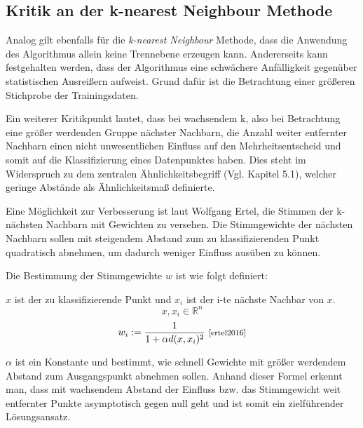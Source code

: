 \documentclass[fontsize=11pt]{scrartcl}
\begin{document}
            \subsection{Kritik an der k-nearest Neighbour Methode}
            \label{subsec:kritikknn}
                Analog gilt ebenfalls für die \emph{k-nearest Neighbour} Methode, dass die Anwendung des Algorithmus allein keine Trennebene erzeugen kann.
                Andererseits kann festgehalten werden, dass der Algorithmus eine schwächere Anfälligkeit gegenüber statistischen Ausreißern aufweist. Grund dafür ist die Betrachtung einer größeren Stichprobe der Trainingsdaten.\par
                        
                Ein weiterer Kritikpunkt lautet, dass bei wachsendem k, also bei Betrachtung eine größer werdenden Gruppe nächster Nachbarn, die Anzahl weiter entfernter Nachbarn einen nicht unwesentlichen Einfluss auf den Mehrheitsentscheid und somit auf die Klassifizierung eines Datenpunktes haben. Dies steht im Widerspruch zu dem zentralen Ähnlichkeitsbegriff (Vgl. Kapitel 5.1), welcher geringe Abstände als Ähnlichkeitsmaß definierte.\par
                Eine Möglichkeit zur Verbesserung ist laut Wolfgang Ertel, die Stimmen der k-nächsten Nachbarn mit Gewichten zu versehen. Die Stimmgewichte der nächsten Nachbarn sollen mit steigendem Abstand zum zu klassifizierenden Punkt quadratisch abnehmen, um dadurch weniger Einfluss ausüben zu können.\cite{ertel2016}\par

                        
                Die Bestimmung der Stimmgewichte $w$ ist wie folgt definiert:\par
                $x$ ist der zu klassifizierende Punkt und $x_i$ ist der i-te nächste Nachbar von $x$.
                $$
                    x,x_i \in \mathbb{R}^n
                $$
                $$
                    w_i:=\frac{1}{1+\alpha d(x,x_i)^2} \text{ \footnotesize\cite[S.212]{ertel2016}}
                $$
                \par
                $\alpha$ ist ein Konstante und bestimmt, wie schnell Gewichte mit größer werdendem Abstand zum Ausgangspunkt abnehmen sollen.\cite{ertel2016} Anhand dieser Formel erkennt man, dass mit wachsendem Abstand der Einfluss bzw. das Stimmgewicht weit entfernter Punkte asymptotisch gegen null geht und ist somit ein zielführender Lösungsansatz.\cite{ertel2016}\par
\end{document}
